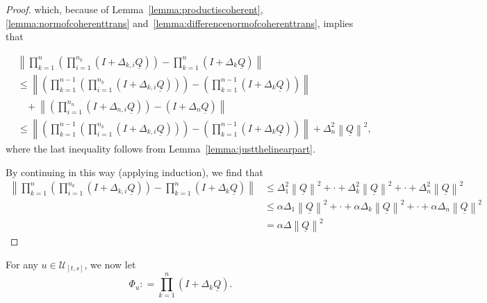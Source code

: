 \documentclass[a4paper,reqno]{amsart}
\newcommand{\lrate}{\underline{Q}}
\newcommand{\norm}[1]{\left\lVert #1 \right\rVert}
\newcommand{\coloneqq}{:\!=}
\begin{document}
\begin{proof}
\noindent
which, because of Lemma~\ref{lemma:productiscoherent}, \ref{lemma:normofcoherenttrans} and~\ref{lemma:differencenormofcoherenttrans}, implies that

\begin{align*}
&\norm{\prod_{k=1}^n\left(\prod_{i=1}^{n_k}(I+\Delta_{k,i}\lrate)\right)
-
\prod_{k=1}^n(I+\Delta_k\lrate)
}\\
&\leq\norm{
\left(
\prod_{k=1}^{n-1}\left(\prod_{i=1}^{n_k}(I+\Delta_{k,i}\lrate)\right)
\right)
-
\left(\prod_{k=1}^{n-1}(I+\Delta_k\lrate)\right)
}\\
&~~~~+\norm{
\left(\prod_{i=1}^{n_n}(I+\Delta_{n,i}\lrate)\right)
-
(I+\Delta_n\lrate)
}\\
&\leq
\norm{
\left(
\prod_{k=1}^{n-1}\left(\prod_{i=1}^{n_k}(I+\Delta_{k,i}\lrate)\right)
\right)
-
\left(\prod_{k=1}^{n-1}(I+\Delta_k\lrate)\right)
}
+
\Delta_n^2\norm{\lrate}^2,
\end{align*}
where the last inequality follows from Lemma~\ref{lemma:justthelinearpart}.

By continuing in this way (applying induction), we find that
\begin{align*}
\norm{\prod_{k=1}^n\left(\prod_{i=1}^{n_k}(I+\Delta_{k,i}\lrate)\right)
-
\prod_{k=1}^n(I+\Delta_k\lrate)
}
&\leq
\Delta_1^2\norm{\lrate}^2+\cdot+\Delta_k^2\norm{\lrate}^2+\cdot
+
\Delta_n^2\norm{\lrate}^2\\
&\leq
\alpha\Delta_1\norm{\lrate}^2+\cdot+\alpha\Delta_k\norm{\lrate}^2+\cdot
+
\alpha\Delta_n\norm{\lrate}^2\\
&=
\alpha\Delta\norm{\lrate}^2
\end{align*}


\end{proof}


For any $u\in\mathcal{U}_{[t,s]}$, we now let
\begin{equation*}
\Phi_u\coloneqq\prod_{k=1}^n(I+\Delta_k\lrate).
\end{equation*}
\end{document}
